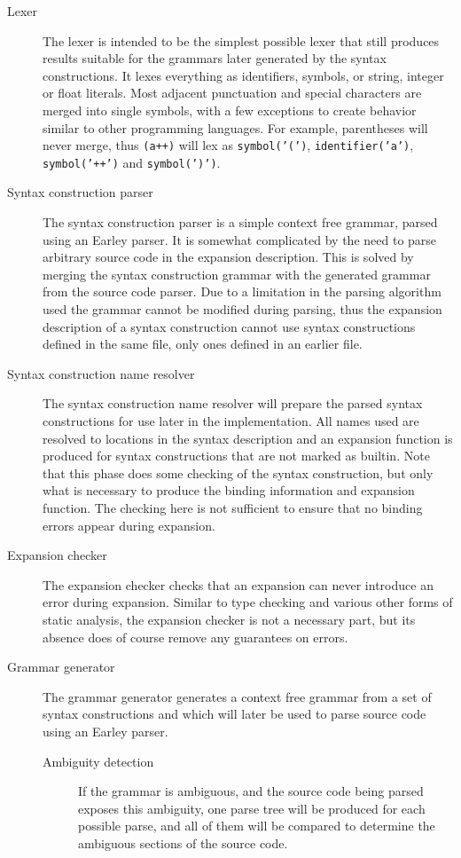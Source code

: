 \documentclass{kththesis}
\begin{document}
\begin{description}
  \item[Lexer] The lexer is intended to be the simplest possible lexer that still produces results suitable for the grammars later generated by the syntax constructions. It lexes everything as identifiers, symbols, or string, integer or float literals. Most adjacent punctuation and special characters are merged into single symbols, with a few exceptions to create behavior similar to other programming languages. For example, parentheses will never merge, thus \texttt{(a++)} will lex as \texttt{symbol('(')}, \texttt{identifier('a')}, \texttt{symbol('++')} and \texttt{symbol(')')}.

  \item[Syntax construction parser] The syntax construction parser is a simple context free grammar, parsed using an Earley \cite{Earley1970An-Efficient-Co} parser. It is somewhat complicated by the need to parse arbitrary source code in the expansion description. This is solved by merging the syntax construction grammar with the generated grammar from the source code parser. Due to a limitation in the parsing algorithm used the grammar cannot be modified during parsing, thus the expansion description of a syntax construction cannot use syntax constructions defined in the same file, only ones defined in an earlier file.

  \item[Syntax construction name resolver] The syntax construction name resolver will prepare the parsed syntax constructions for use later in the implementation. All names used are resolved to locations in the syntax description and an expansion function is produced for syntax constructions that are not marked as builtin. Note that this phase does some checking of the syntax construction, but only what is necessary to produce the binding information and expansion function. The checking here is not sufficient to ensure that no binding errors appear during expansion.

  \item[Expansion checker] The expansion checker checks that an expansion can never introduce an error during expansion. Similar to type checking and various other forms of static analysis, the expansion checker is not a necessary part, but its absence does of course remove any guarantees on errors.

  \item[Grammar generator] The grammar generator generates a context free grammar from a set of syntax constructions and which will later be used to parse source code using an Earley \cite{Earley1970An-Efficient-Co} parser.
  \begin{description}
    \item[Ambiguity detection] If the grammar is ambiguous, and the source code being parsed exposes this ambiguity, one parse tree will be produced for each possible parse, and all of them will be compared to determine the ambiguous sections of the source code.
  \end{description}


\end{description}
\end{document}
